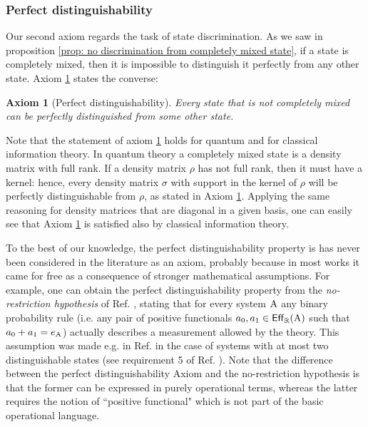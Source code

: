 \documentclass[12pt,aps,pra,showpacs,groupedaddress]{revtex4-1}
\newtheorem{axiom}{Axiom}\newtheorem{postulate}{Postulate}
\def\Cntset{{\mathsf{Eff}}}
\def\Stset{{\mathsf{St}}}
\def\Reals{{\mathbb R}}
\begin{document}
\subsubsection{Perfect distinguishability}

Our second axiom regards the task of state discrimination.    As we saw in proposition \ref{prop: no
  discrimination from completely mixed state}, if a state is completely mixed, then it is impossible
to distinguish it perfectly from any other state.  Axiom \ref{norestr} states the converse:
\begin{axiom}[Perfect distinguishability]
Every state that is not completely mixed can be perfectly distinguished from some other state.   
\label{norestr}
\end{axiom}

 
Note that the statement of axiom \ref{norestr} holds for quantum and for classical information theory. In quantum theory a
completely mixed state is a density matrix with full rank.  If a density matrix $\rho$ has not full
rank, then it must have a kernel: hence, every density matrix $\sigma$ with support in the kernel of
$\rho$ will be perfectly distinguishable from $\rho$, as stated in Axiom \ref{norestr}. Applying the
same reasoning for density matrices that are diagonal in a given basis, one can easily see that
Axiom \ref{norestr} is satisfied also by classical information theory.

To the best of our knowledge, the perfect distinguishability property is has never been considered in the literature as an axiom, probably because in most works it came for free as a consequence of stronger mathematical assumptions.  For example, one can obtain the perfect distinguishability property from the \emph{no-restriction hypothesis} of Ref. \cite{purification}, stating that for every system ${\rm A}$ any binary probability rule (i.e. any pair of positive functionals $a_0, a_1  \in \Cntset_\Reals(\rA)$ such that $a_0 + a_1 = e_{\rm A}$)  actually describes a measurement allowed by the theory.   This assumption was made e.g. in Ref. \cite{Mas10} in the case of  systems with at most two distinguishable states (see requirement 5 of Ref. \cite{Mas10}).  Note that the difference between the perfect distinguishability Axiom and the no-restriction hypothesis is that the former can be expressed in purely operational terms, whereas the latter requires the notion of ``positive functional" which is not part of the basic operational language.  
\end{document}
